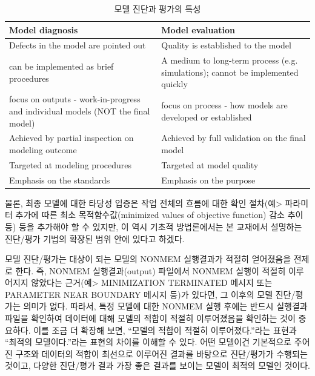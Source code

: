 \documentclass[
  11pt,
  krantz2,
  a4paper]{krantz}
\theoremstyle{definition}
\theoremstyle{definition}
\theoremstyle{definition}
\theoremstyle{remark}
\begin{document}
\begin{table}

\caption{\label{tab:diag-eval-property}모델 진단과 평가의 특성}
\centering
\begin{tabular}[t]{>{\raggedright\arraybackslash}p{6cm}>{\raggedright\arraybackslash}p{6cm}}
\toprule
Model diagnosis & Model evaluation\\
\midrule
Defects in the model are pointed out & Quality is established to the model\\
can be implemented as brief procedures & A medium to long-term process (e.g. simulations); cannot be implemented quickly\\
focus on outputs - work-in-progress and individual models (NOT the final model) & focus on process - how models are developed or established\\
Achieved by partial inspection on modeling outcome & Achieved by full validation on the final model\\
Targeted at modeling procedures & Targeted at model quality\\
\addlinespace
Emphasis on the standards & Emphasis on the purpose\\
\bottomrule
\end{tabular}
\end{table}



물론, 최종 모델에 대한 타당성 입증은 작업 전체의 흐름에 대한 확인 절차(예\textgreater{} 파라미터 추가에 따른 최소 목적함수값(minimized values of objective function) 감소 추이 등) 등을 추가해야 할 수 있지만, 이 역시 기초적 방법론에서는 본 교재에서 설명하는 진단/평가 기법의 확장된 범위 안에 있다고 하겠다.

모델 진단/평가는 대상이 되는 모델의 NONMEM 실행결과가 적절히 얻어졌음을 전제로 한다. 즉, NONMEM 실행결과(output) 파일에서 NONMEM 실행이 적절히 이루어지지 않았다는 근거(예\textgreater{} MINIMIZATION TERMINATED 메시지 또는 PARAMETER NEAR BOUNDARY 메시지 등)가 있다면, 그 이후의 모델 진단/평가는 의미가 없다. 따라서, 특정 모델에 대한 NONMEM 실행 후에는 반드시 실행결과 파일을 확인하여 데이터에 대해 모델의 적합이 적절히 이루어졌음을 확인하는 것이 중요하다. 이를 조금 더 확장해 보면, ``모델의 적합이 적절히 이루어졌다.''라는 표현과 ``최적의 모델이다.''라는 표현의 차이를 이해할 수 있다. 어떤 모델이건 기본적으로 주어진 구조와 데이터의 적합이 최선으로 이루어진 결과를 바탕으로 진단/평가가 수행되는 것이고, 다양한 진단/평가 결과 가장 좋은 결과를 보이는 모델이 최적의 모델인 것이다.
\end{document}
